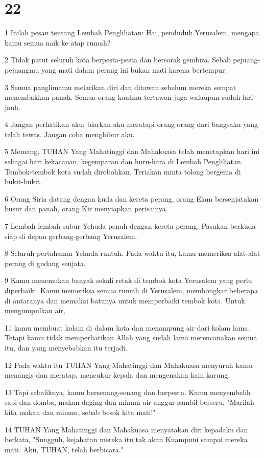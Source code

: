 \chapter{22}

\par 1 Inilah pesan tentang Lembah Penglihatan: Hai, penduduk Yerusalem, mengapa kamu semua naik ke atap rumah?
\par 2 Tidak patut seluruh kota berpesta-pesta dan bersorak gembira. Sebab pejuang-pejuangmu yang mati dalam perang ini bukan mati karena bertempur.
\par 3 Semua panglimamu melarikan diri dan ditawan sebelum mereka sempat menembakkan panah. Semua orang kuatmu tertawan juga walaupun sudah lari jauh.
\par 4 Jangan perhatikan aku; biarkan aku meratapi orang-orang dari bangsaku yang telah tewas. Jangan coba menghibur aku.
\par 5 Memang, TUHAN Yang Mahatinggi dan Mahakuasa telah menetapkan hari ini sebagai hari kekacauan, kegemparan dan huru-hara di Lembah Penglihatan. Tembok-tembok kota sudah dirobohkan. Teriakan minta tolong bergema di bukit-bukit.
\par 6 Orang Siria datang dengan kuda dan kereta perang, orang Elam bersenjatakan busur dan panah, orang Kir menyiapkan perisainya.
\par 7 Lembah-lembah subur Yehuda penuh dengan kereta perang. Pasukan berkuda siap di depan gerbang-gerbang Yerusalem.
\par 8 Seluruh pertahanan Yehuda runtuh. Pada waktu itu, kamu memeriksa alat-alat perang di gudang senjata.
\par 9 Kamu menemukan banyak sekali retak di tembok kota Yerusalem yang perlu diperbaiki. Kamu memeriksa semua rumah di Yerusalem, membongkar beberapa di antaranya dan memakai batunya untuk memperbaiki tembok kota. Untuk mengumpulkan air,
\par 11 kamu membuat kolam di dalam kota dan menampung air dari kolam lama. Tetapi kamu tidak memperhatikan Allah yang sudah lama merencanakan semua itu, dan yang menyebabkan itu terjadi.
\par 12 Pada waktu itu TUHAN Yang Mahatinggi dan Mahakuasa menyuruh kamu menangis dan meratap, mencukur kepala dan mengenakan kain karung.
\par 13 Tapi sebaliknya, kamu bersenang-senang dan berpesta. Kamu menyembelih sapi dan domba, makan daging dan minum air anggur sambil berseru, "Marilah kita makan dan minum, sebab besok kita mati!"
\par 14 TUHAN Yang Mahatinggi dan Mahakuasa menyatakan diri kepadaku dan berkata, "Sungguh, kejahatan mereka itu tak akan Kuampuni sampai mereka mati. Aku, TUHAN, telah berbicara."
